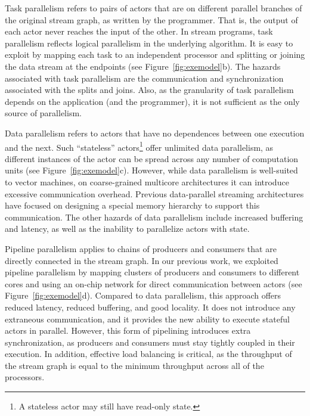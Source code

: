 Task parallelism refers to pairs of actors that are on different
parallel branches of the original stream graph, as written by the
programmer.  That is, the output of each actor never reaches the input
of the other.  In stream programs, task parallelism reflects logical
parallelism in the underlying algorithm.  It is easy to exploit by
mapping each task to an independent processor and splitting or joining
the data stream at the endpoints (see Figure~\ref{fig:exemodel}b).
The hazards associated with task parallelism are the communication and
synchronization associated with the splits and joins.  Also, as the
granularity of task parallelism depends on the application (and the
programmer), it is not sufficient as the only source of parallelism.

Data parallelism refers to actors that have no dependences between one
execution and the next.  Such ``stateless'' actors\footnote{A
stateless actor may still have read-only state.}  offer unlimited data
parallelism, as different instances of the actor can be spread across
any number of computation units (see Figure~\ref{fig:exemodel}c).
However, while data parallelism is well-suited to vector machines, on
coarse-grained multicore architectures it can introduce excessive
communication overhead.  Previous data-parallel streaming
architectures have focused on designing a special memory hierarchy to
support this communication\cite{imagine}.  The other hazards of data
parallelism include increased buffering and latency, as well as the
inability to parallelize actors with state.

Pipeline parallelism applies to chains of producers and consumers that
are directly connected in the stream graph.  In our previous
work\cite{gordon02asplos}, we exploited pipeline parallelism by
mapping clusters of producers and consumers to different cores and
using an on-chip network for direct communication between actors (see
Figure~\ref{fig:exemodel}d).  Compared to data parallelism, this
approach offers reduced latency, reduced buffering, and good locality.
It does not introduce any extraneous communication, and it provides
the new ability to execute stateful actors in parallel.  However, this
form of pipelining introduces extra synchronization, as producers and
consumers must stay tightly coupled in their execution.  In addition,
effective load balancing is critical, as the throughput of the stream
graph is equal to the minimum throughput across all of the processors.

